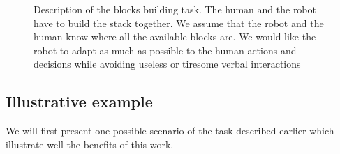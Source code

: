 \documentclass[english,a4paper,11pt,twoside]{StyleThese}
\begin{document}
\begin{figure}[!h]
\centering
    \caption{Description of the blocks building task. The human and the robot have to build the stack together. We assume that the robot and the human know where all the available blocks are. We would like the robot to adapt as much as possible to the human actions and decisions while avoiding useless or tiresome verbal interactions}
    \label{fig:blocksBuildingTask}
\end{figure}

\subsection{Illustrative example}

We will first present one possible scenario of the task described earlier which illustrate well the benefits of this work.
\end{document}
